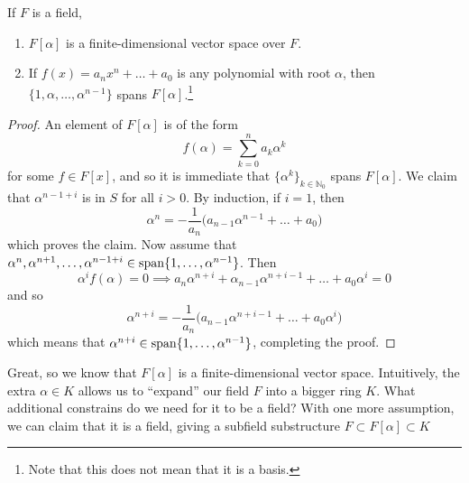   \begin{lemma}
    If $F$ is a field, 
    \begin{enumerate}
      \item $F[\alpha]$ is a finite-dimensional vector space over $F$. 
      \item If $f(x) = a_n x^n + \ldots + a_0$ is any polynomial with root $\alpha$, then $\{1, \alpha, \ldots, \alpha^{n-1}\}$ spans $F[\alpha]$.\footnote{Note that this does not mean that it is a basis.} 
    \end{enumerate}
  \end{lemma}
  \begin{proof}
    An element of $F[\alpha]$ is of the form 
    \begin{equation}
      f(\alpha) = \sum_{k=0}^n a_k \alpha^k
    \end{equation} 
    for some $f \in F[x]$, and so it is immediate that $\{\alpha^k\}_{k \in \mathbb{N}_0}$ spans $F[\alpha]$. We claim that $\alpha^{n-1+i}$ is in $S$ for all $i > 0$. By induction, if $i = 1$, then 
    \begin{equation}
      \alpha^n = -\frac{1}{a_n} \big( a_{n-1} \alpha^{n-1} + \ldots + a_0 \big)
    \end{equation}
    which proves the claim. Now assume that $\alpha^n, \alpha^{n+1}, \ldots, \alpha^{n-1+i} \in \operatorname{span}\{1, \ldots, \alpha^{n-1}\}$. Then 
    \begin{equation}
      \alpha^i f(\alpha) = 0 \implies a_n \alpha^{n+i} + \alpha_{n-1} \alpha^{n+i-1} + \ldots + a_0 \alpha^i = 0 
    \end{equation}
    and so 
    \begin{equation}
      \alpha^{n+i} = -\frac{1}{a_n} \big(a_{n-1} \alpha^{n+i-1} + \ldots + a_0 \alpha^i)
    \end{equation}
    which means that $\alpha^{n+i} \in \operatorname{span}\{1, \ldots, \alpha^{n-1}\}$, completing the proof. 
  \end{proof} 

  Great, so we know that $F[\alpha]$ is a finite-dimensional vector space. Intuitively, the extra $\alpha \in K$ allows us to ``expand'' our field $F$ into a bigger ring $K$. What additional constrains do we need for it to be a field? With one more assumption, we can claim that it is a field, giving a subfield substructure $F \subset F[\alpha] \subset K$

